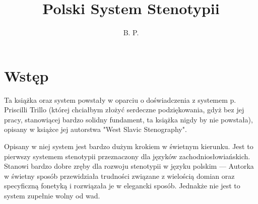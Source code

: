 \documentclass[12p, oneside]{book}
\begin{document}
\frontmatter

\title{Polski System Stenotypii}

\author{B. P.}
\maketitle
\newpage

\tableofcontents

\mainmatter

\chapter{Wstęp}
Ta książka oraz system powstały w oparciu o doświadczenia z systemem
p. Priscilli Trillo (której chciałbym złożyć serdeczne podziękowania, gdyż bez
jej pracy, stanowiącej bardzo solidny fundament, ta książka nigdy by nie
powstała), opisany w książce jej autorstwa "West Slavic Stenography".

Opisany w niej system jest bardzo dużym krokiem w świetnym kierunku. Jest to
pierwszy systemem stenotypii przeznaczony dla języków zachodniosłowiańskich.
Stanowi bardzo dobre zręby dla rozwoju stenotypii w języku polskim --- Autorka
w świetny sposób przewidziała trudności związane z wielością domian oraz
specyficzną fonetyką i rozwiązała je w elegancki sposób. Jednakże nie jest to
system zupełnie wolny od wad.
\end{document}
